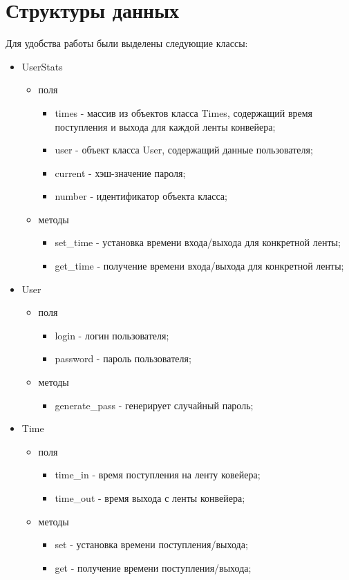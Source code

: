 \documentclass[a4paper,oneside,14pt]{extreport}
\begin{document}
\section{Структуры данных}
Для удобства работы были выделены следующие классы:
\begin{itemize}
	\item UserStats
	\begin{itemize}
		\item поля
		\begin{itemize}
			\item times - массив из объектов класса Times, содержащий время поступления и выхода для каждой ленты конвейера;
			\item user - объект класса User, содержащий данные пользователя;
			\item current - хэш-значение пароля;
			\item number - идентификатор объекта класса;
		\end{itemize}
		\item методы
		\begin{itemize}
			\item set\_time - установка времени входа/выхода для конкретной ленты;
			\item get\_time - получение времени входа/выхода для конкретной ленты;
		\end{itemize}
	\end{itemize}
	\item User
	\begin{itemize}
		\item поля
		\begin{itemize}
			\item login - логин пользователя;
			\item password - пароль пользователя;
		\end{itemize}
		\item методы
		\begin{itemize}
			\item generate\_pass - генерирует случайный пароль;
		\end{itemize}
	\end{itemize}
	\item Time
	\begin{itemize}
		\item поля
		\begin{itemize}
			\item time\_in - время поступления на ленту ковейера;
			\item time\_out - время выхода с ленты конвейера;
		\end{itemize}
		\item методы
		\begin{itemize}
			\item set - установка времени поступления/выхода;
			\item get - получение времени поступления/выхода;
		\end{itemize}
	\end{itemize}
\end{itemize}
\end{document}
